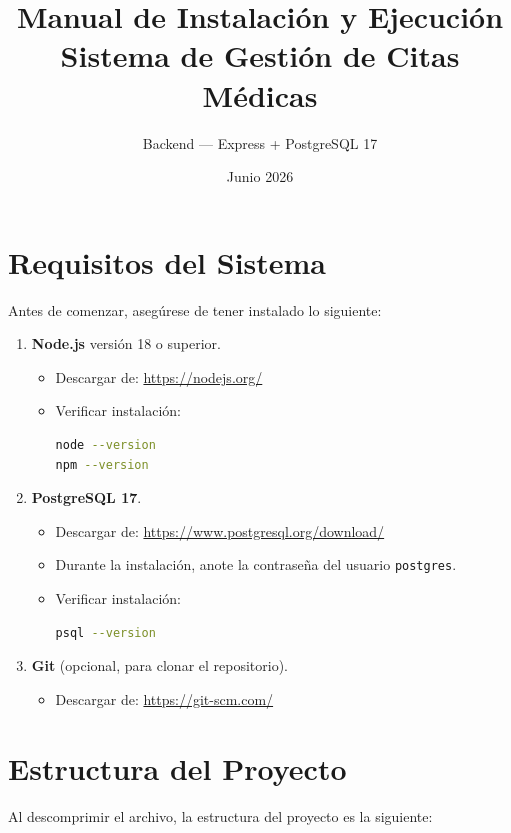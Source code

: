 \documentclass[12pt,a4paper]{article}
\title{\textbf{Manual de Instalación y Ejecución}\\Sistema de Gestión de Citas Médicas}
\author{Backend --- Express + PostgreSQL 17}
\date{Junio 2026}
\begin{document}
\maketitle
\newpage

\tableofcontents
\newpage

\section{Requisitos del Sistema}
Antes de comenzar, asegúrese de tener instalado lo siguiente:

\begin{enumerate}
    \item \textbf{Node.js} versión 18 o superior.
          \begin{itemize}
              \item Descargar de: \url{https://nodejs.org/}
              \item Verificar instalación:
                    \begin{lstlisting}[language=bash]
node --version
npm --version
                    \end{lstlisting}
          \end{itemize}

    \item \textbf{PostgreSQL 17}.
          \begin{itemize}
              \item Descargar de: \url{https://www.postgresql.org/download/}
              \item Durante la instalación, anote la contraseña del usuario \texttt{postgres}.
              \item Verificar instalación:
                    \begin{lstlisting}[language=bash]
psql --version
                    \end{lstlisting}
          \end{itemize}

    \item \textbf{Git} (opcional, para clonar el repositorio).
          \begin{itemize}
              \item Descargar de: \url{https://git-scm.com/}
          \end{itemize}
\end{enumerate}

\section{Estructura del Proyecto}
Al descomprimir el archivo, la estructura del proyecto es la siguiente:
\end{document}

